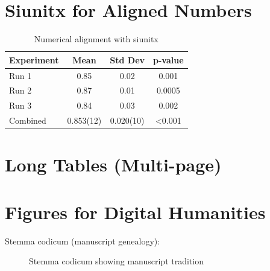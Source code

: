 \documentclass[12pt,a4paper]{article}
\begin{document}
\section{Siunitx for Aligned Numbers}\label{sec:siunitx}
\begin{table}[htbp]
\centering
\caption{Numerical alignment with siunitx}\label{tab:siunitx}
\begin{tabular}{lSSS}
\toprule
Experiment & {Mean} & {Std Dev} & {p-value} \\
\midrule
Run 1 & 0.85 & 0.02 & 0.001 \\
Run 2 & 0.87 & 0.01 & 0.0005 \\
Run 3 & 0.84 & 0.03 & 0.002 \\
Combined & 0.853(12) & 0.020(10) & <0.001 \\
\bottomrule
\end{tabular}
\end{table}

\section{Long Tables (Multi-page)}\label{sec:longtable}

\section{Figures for Digital Humanities}\label{sec:dh-figures}
Stemma codicum (manuscript genealogy):
\begin{figure}[htbp]
\centering
{}
\caption{Stemma codicum showing manuscript tradition}\label{fig:stemma}
\end{figure}
\end{document}
